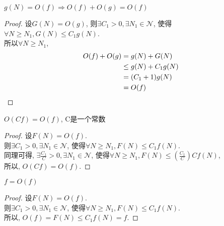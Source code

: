 \documentclass[a4paper]{ctexart}
\begin{document}
\begin{sloppypar}
    \begin{theorem}
        $g(N) = O(f) \Rightarrow O(f) + O(g) = O(f)$
    \end{theorem}
    \begin{proof}
        设$G(N) = O(g)$,
        则$\exists C_1 > 0, \exists N_1 \in \mathcal{N}$,
        使得$\forall N \geq N_1, G(N) \leq C_1g(N)$.\\
        所以$\forall N \geq N_1$,
        \begin{align*}
            O(f) + O(g) & = g(N) + G(N)       \\
                        & \leq g(N) + C_1g(N) \\
                        & = (C_1 + 1)g(N)     \\
                        & = O(f)
            \qedhere
        \end{align*}
        \qedhere
    \end{proof}
    \vspace{1em}

    \begin{theorem}
        $O(Cf) = O(f)$, C是一个常数
    \end{theorem}
    \begin{proof}
        设$F(N) = O(f)$.\\
        则$\exists C_1 > 0, \exists N_1 \in \mathcal{N}$,
        使得$\forall N \geq N_1, F(N) \leq C_1f(N)$.\\
        同理可得, $\exists \frac{C_1}{C} > 0, \exists N_1 \in \mathcal{N}$,
        使得$\forall N \geq N_1, F(N) \leq (\frac{C_1}{C})Cf(N)$,\\
        所以, $O(Cf) = O(f)$.
        \qedhere
    \end{proof}
    \vspace{1em}

    \begin{theorem}
        $f = O(f)$
    \end{theorem}
    \begin{proof}
        设$F(N) = O(f)$.\\
        则$\exists C_1 > 0, \exists N_1 \in \mathcal{N}$,
        使得$\forall N \geq N_1, F(N) \leq C_1f(N)$.\\
        所以, $O(f) = F(N) \leq C_1f(N) = f$.
        \qedhere
    \end{proof}
    \vspace{1em}

\end{sloppypar}
\end{document}

